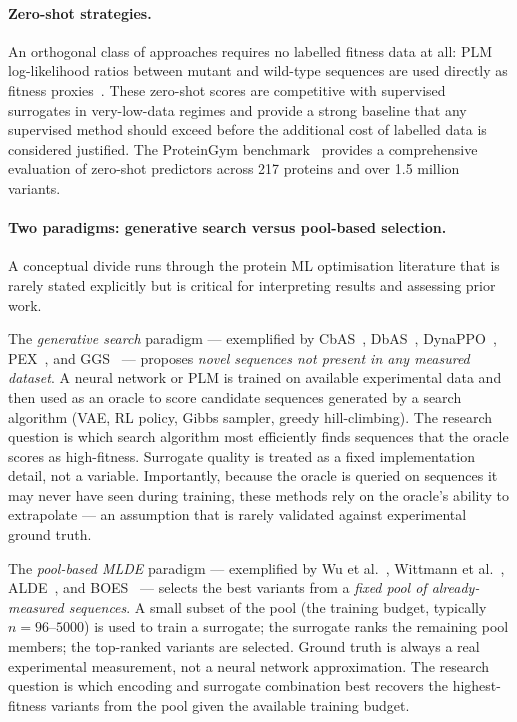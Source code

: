 \documentclass[english, 12pt, a4paper, elec, utf8, a-2b, online]{aaltothesis}
\begin{document}
\paragraph{Zero-shot strategies.}
An orthogonal class of approaches requires no labelled fitness data at all: PLM
log-likelihood ratios between mutant and wild-type sequences are used directly as fitness
proxies~\cite{Notin2022Tranception, Hie2024}.
These zero-shot scores are competitive with supervised surrogates in very-low-data regimes
and provide a strong baseline that any supervised method should exceed before the additional
cost of labelled data is considered justified.
The ProteinGym benchmark~\cite{Notin2023ProteinGym} provides a comprehensive evaluation of
zero-shot predictors across 217 proteins and over 1.5 million variants.

\paragraph{Two paradigms: generative search versus pool-based selection.}
A conceptual divide runs through the protein ML optimisation literature that is rarely stated
explicitly but is critical for interpreting results and assessing prior work.

The \emph{generative search} paradigm --- exemplified by
CbAS~\cite{Brookes2019CbAS}, DbAS~\cite{Brookes2018DbAS},
DynaPPO~\cite{Angermueller2020DynaPPO}, PEX~\cite{Ren2022PEX},
and GGS~\cite{Kirjner2023GGS} --- proposes \emph{novel sequences not present in any
measured dataset}.
A neural network or PLM is trained on available experimental data and then used as an
oracle to score candidate sequences generated by a search algorithm (VAE, RL policy,
Gibbs sampler, greedy hill-climbing).
The research question is which search algorithm most efficiently finds sequences that
the oracle scores as high-fitness.
Surrogate quality is treated as a fixed implementation detail, not a variable.
Importantly, because the oracle is queried on sequences it may never have seen during training,
these methods rely on the oracle's ability to extrapolate --- an assumption that is rarely
validated against experimental ground truth.

The \emph{pool-based MLDE} paradigm --- exemplified by Wu et al.~\cite{Wu2019},
Wittmann et al.~\cite{Wittmann2021}, ALDE~\cite{Yang2025}, and
BOES~\cite{Soldat2025BOES} --- selects the best variants from a \emph{fixed pool of
already-measured sequences}.
A small subset of the pool (the training budget, typically $n = 96$--$5000$) is used to
train a surrogate; the surrogate ranks the remaining pool members; the top-ranked
variants are selected.
Ground truth is always a real experimental measurement, not a neural network
approximation.
The research question is which encoding and surrogate combination best recovers the
highest-fitness variants from the pool given the available training budget.
\end{document}

